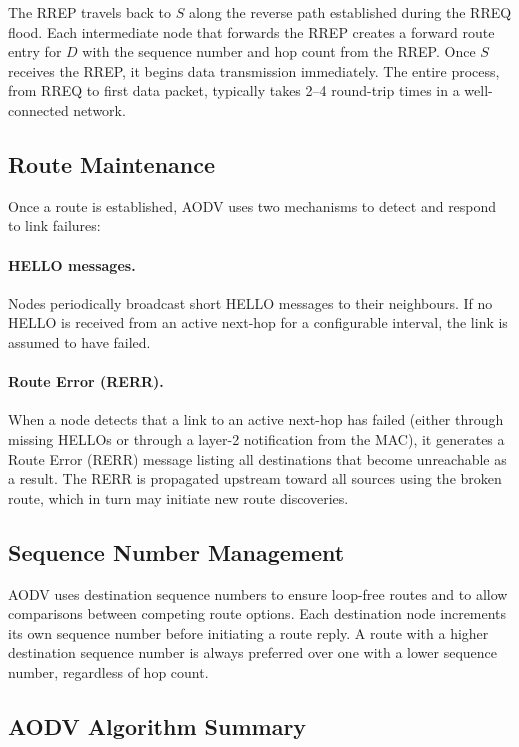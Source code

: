 The RREP travels back to $S$ along the reverse path established during the RREQ flood.
Each intermediate node that forwards the RREP creates a forward route entry for $D$
with the sequence number and hop count from the RREP. Once $S$ receives the RREP,
it begins data transmission immediately. The entire process, from RREQ to first data
packet, typically takes 2--4 round-trip times in a well-connected network.

\subsection{Route Maintenance}

Once a route is established, AODV uses two mechanisms to detect and respond to link
failures:

\paragraph{HELLO messages.}
Nodes periodically broadcast short HELLO messages to their neighbours. If no HELLO is
received from an active next-hop for a configurable interval, the link is assumed to have
failed.

\paragraph{Route Error (RERR).}
When a node detects that a link to an active next-hop has failed (either through missing
HELLOs or through a layer-2 notification from the MAC), it generates a Route Error
(RERR) message listing all destinations that become unreachable as a result. The RERR
is propagated upstream toward all sources using the broken route, which in turn may
initiate new route discoveries.

\subsection{Sequence Number Management}

AODV uses destination sequence numbers to ensure loop-free routes and to allow
comparisons between competing route options. Each destination node increments its own
sequence number before initiating a route reply. A route with a higher destination
sequence number is always preferred over one with a lower sequence number, regardless
of hop count.

\subsection{AODV Algorithm Summary}

